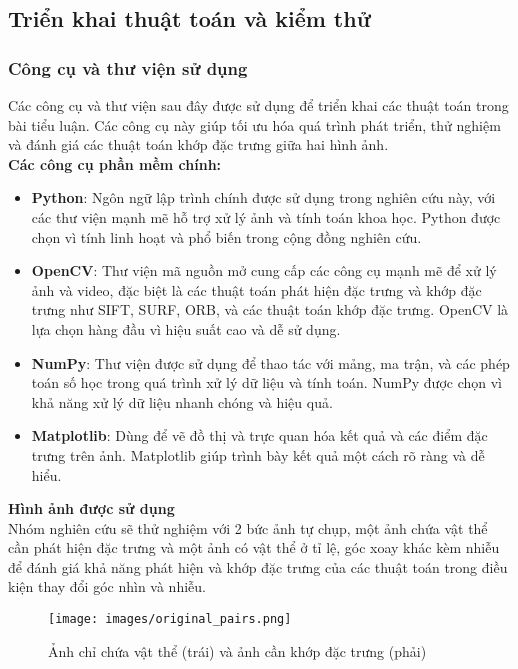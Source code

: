 \subsection{Triển khai thuật toán và kiểm thử}
\subsubsection{Công cụ và thư viện sử dụng}
Các công cụ và thư viện sau đây được sử dụng để triển khai các thuật toán trong bài tiểu luận. Các công cụ này giúp tối ưu hóa quá trình phát triển, thử nghiệm và đánh giá các thuật toán khớp đặc trưng giữa hai hình ảnh.\\

\textbf{Các công cụ phần mềm chính:}

\begin{itemize}
	\item \textbf{Python}: Ngôn ngữ lập trình chính được sử dụng trong nghiên cứu này, với các thư viện mạnh mẽ hỗ trợ xử lý ảnh và tính toán khoa học. Python được chọn vì tính linh hoạt và phổ biến trong cộng đồng nghiên cứu.
	\item \textbf{OpenCV}: Thư viện mã nguồn mở cung cấp các công cụ mạnh mẽ để xử lý ảnh và video, đặc biệt là các thuật toán phát hiện đặc trưng và khớp đặc trưng như SIFT, SURF, ORB, và các thuật toán khớp đặc trưng. OpenCV là lựa chọn hàng đầu vì hiệu suất cao và dễ sử dụng.
	\item \textbf{NumPy}: Thư viện được sử dụng để thao tác với mảng, ma trận, và các phép toán số học trong quá trình xử lý dữ liệu và tính toán. NumPy được chọn vì khả năng xử lý dữ liệu nhanh chóng và hiệu quả.
	\item \textbf{Matplotlib}: Dùng để vẽ đồ thị và trực quan hóa kết quả và các điểm đặc trưng trên ảnh. Matplotlib giúp trình bày kết quả một cách rõ ràng và dễ hiểu.
\end{itemize}

\textbf{Hình ảnh được sử dụng}\\

Nhóm nghiên cứu sẽ thử nghiệm với 2 bức ảnh tự chụp, một ảnh chứa vật thể cần phát hiện đặc trưng và một ảnh có vật thể ở tỉ lệ, góc xoay khác kèm nhiễu để đánh giá khả năng phát hiện và khớp đặc trưng của các thuật toán trong điều kiện thay đổi góc nhìn và nhiễu.

\begin{figure}[H]
	\centering
	\texttt{[image: images/original\_pairs.png]}
	\caption{Ảnh chỉ chứa vật thể (trái) và ảnh cần khớp đặc trưng (phải)}
\end{figure}

